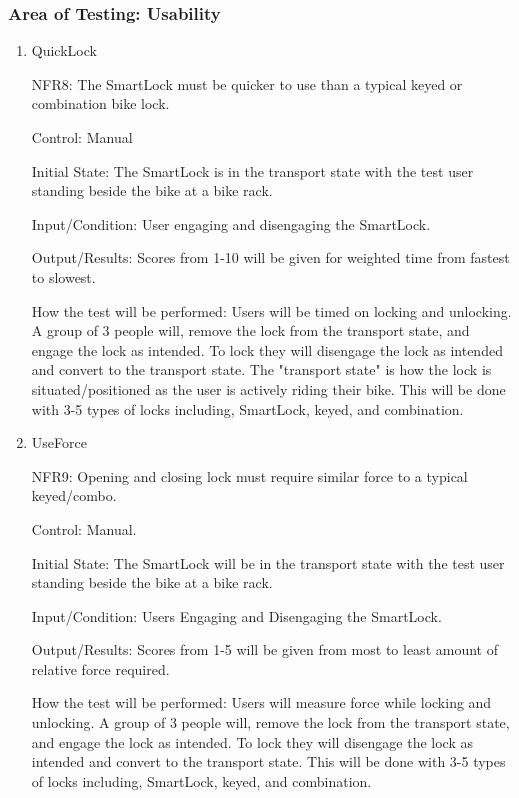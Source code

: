 \documentclass[12pt, titlepage]{article}
\begin{document}
\subsubsection{Area of Testing: Usability}

\begin{enumerate}

\item{QuickLock

NFR8: The SmartLock must be quicker to use than a typical keyed or combination bike lock.  }

Control: Manual 

Initial State: The SmartLock is in the transport state with the test user standing beside the bike at a bike rack.

Input/Condition: User engaging and disengaging the SmartLock.

Output/Results: Scores from 1-10 will be given for weighted time from fastest to slowest.

How the test will be performed: Users will be timed on locking and unlocking. A group of 3 people will, remove the lock from the transport state, and engage the lock as intended. To lock they will disengage the lock as intended and convert to the transport state. The "transport state" is how the lock is situated/positioned as the user is actively riding their bike. This will be done with 3-5 types of locks including, SmartLock, keyed, and combination. 

\item{UseForce

NFR9: Opening and closing lock must require similar force to a typical keyed/combo.  }

Control: Manual.

Initial State: The SmartLock will be in the transport state with the test user standing beside the bike at a bike rack.

Input/Condition: Users Engaging and Disengaging the SmartLock.

Output/Results: Scores from 1-5 will be given from most to least amount of relative force required.

How the test will be performed: Users will measure force while locking and unlocking. A group of 3 people will, remove the lock from the transport state, and engage the lock as intended. To lock they will disengage the lock as intended and convert to the transport state. This will be done with 3-5 types of locks including, SmartLock, keyed, and combination.


\end{enumerate}
\end{document}
